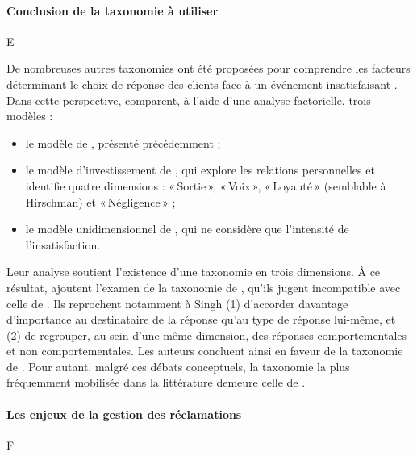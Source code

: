 \documentclass[a4paper,12pt, openany]{book}
\begin{document}
\paragraph{Conclusion de la taxonomie à utiliser} E

De nombreuses autres taxonomies ont été proposées pour comprendre les facteurs déterminant le choix de réponse des clients face à un événement insatisfaisant \parencite{boote98, istanbulluoglu17, mattila04, ndubisi06, panda14, son08}. Dans cette perspective, \textcite{maute93} comparent, à l’aide d'une analyse factorielle, trois modèles :
\begin{itemize}
    \item le modèle de \textcite{hirschman70}, présenté précédemment ;
    \item le modèle d'investissement de \textcite{rusbult82}, qui explore les relations personnelles et identifie quatre dimensions : «\,Sortie\,», «\,Voix\,», «\,Loyauté\,» (semblable à Hirschman) et «\,Négligence\,» ;
    \item le modèle unidimensionnel de \textcite{bearden83}, qui ne considère que l'intensité de l'insatisfaction.
\end{itemize}
Leur analyse soutient l'existence d'une taxonomie en trois dimensions. À ce résultat, \textcite{maute93} ajoutent l'examen de la taxonomie de \textcite{singh88}, qu'ils jugent incompatible avec celle de \textcite{day77}. Ils reprochent notamment à Singh (1) d'accorder davantage d'importance au destinataire de la réponse qu'au type de réponse lui-même, et (2) de regrouper, au sein d'une même dimension, des réponses comportementales et non comportementales. Les auteurs concluent ainsi en faveur de la taxonomie de \textcite{hirschman70}. Pour autant, malgré ces débats conceptuels, la taxonomie la plus fréquemment mobilisée dans la littérature demeure celle de \textcite{day77}. \par


\paragraph{Les enjeux de la gestion des réclamations} F
\end{document}
